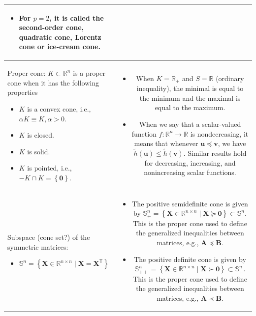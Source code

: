 \documentclass{article}
\begin{document}
\begin{xltabular}{\textwidth}{|A|C|}
\begin{itemize}[leftmargin=*]
		\item For \(p=2\), it is called the second-order cone, quadratic cone,  Lorentz cone or ice-cream cone.
	\end{itemize} \\
	\hline
	Proper cone: \(K \subset \mathbb{R}^{n}\) is a proper cone when it has the following properties
	\begin{itemize}
		\item \(K\) is a convex cone, i.e., \(\alpha K \equiv K, \alpha > 0\).
		\item \(K\) is closed.
		\item \(K\) is solid.
		\item \(K\) is pointed, i.e., \(-K \cap K = \left\{ \mathbf{0} \right\}\).
	\end{itemize} & \vspace{-3.5ex} \begin{itemize}[leftmargin=*]
		\item When \(K = \mathbb{R}_{+}\) and \(S = \mathbb{R}\) (ordinary inequality), the minimal is equal to the minimum and the maximal is equal to the maximum.
		\item When we say that a scalar-valued function \(f: \mathbb{R}^{n} \rightarrow \mathbb{R}\) is nondecreasing, it means that whenever \(\mathbf{u}\preceq \mathbf{v}\), we have \(\tilde{h}(\mathbf{u})\leq \tilde{h}(\mathbf{v})\). Similar results hold for decreasing, increasing, and nonincreasing scalar functions.
	\end{itemize} \\
	\hline
	Subspace (cone set?) of the symmetric matrices:
	\begin{itemize}
		\item \(\mathbb{S}^n = \left\{ \mathbf{X} \in \mathbb{R}^{n\times n} \mid \mathbf{X} = \mathbf{X}^\mathsf{T}\right\}\)
	\end{itemize} & \vspace{-3.5ex} \begin{itemize}[leftmargin=*]
		\item The positive semidefinite cone is given by \(\mathbb{S}^n_+ = \left\{ \mathbf{X} \in \mathbb{R}^{n\times n} \mid \mathbf{X} \succeq \mathbf{0} \right\} \subset \mathbb{S}^n\). This is the proper cone used to define the generalized inequalities between matrices, e.g., \(\mathbf{A} \preceq \mathbf{B}\).
		\item The positive definite cone is given by \(\mathbb{S}^n_{++} = \left\{ \mathbf{X} \in \mathbb{R}^{n\times n} \mid \mathbf{X} \succ \mathbf{0} \right\}\subset \mathbb{S}^n_+ \). This is the proper cone used to define the generalized inequalities between matrices, e.g., \(\mathbf{A} \prec \mathbf{B}\).

\end{itemize}
\end{xltabular}
\end{document}

